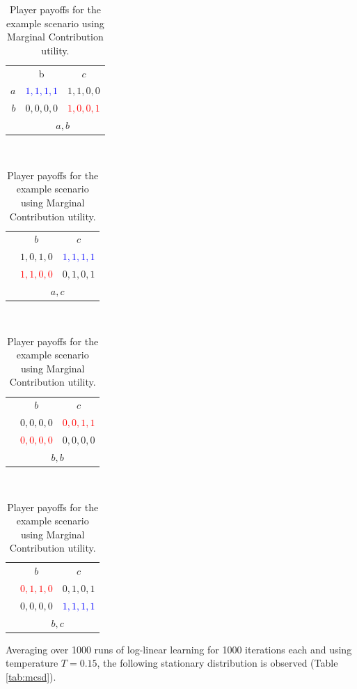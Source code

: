 \documentclass[11pt, onecolumn, compsoc, letterpaper]{article}
\begin{document}
\begin{table}[!htb]
	\centering\begin{tabular}{r|c|c|}
	\multicolumn{1}{c}{}
	& \multicolumn{1}{c}{b}
	& \multicolumn{1}{c}{$c$}\\
	\cline{2-3}
	$a$ & \textcolor{blue}{$1,1,1,1$} & $1,1,0,0$\\
	\cline{2-3}
	$b$ & $0,0,0,0$ & \textcolor{red}{$1,0,0,1$}\\
	\cline{2-3}
	\multicolumn{1}{c}{}
	& \multicolumn{2}{c}{$a,b$}
	\end{tabular}~
	\centering\begin{tabular}{r|c|c|}
	\multicolumn{1}{c}{}
	& \multicolumn{1}{c}{$b$}
	& \multicolumn{1}{c}{$c$}\\
	\cline{2-3}
	& $1,0,1,0$ & \textcolor{blue}{$1,1,1,1$}\\
	\cline{2-3}
	& \textcolor{red}{$1,1,0,0$} & $0,1,0,1$\\
	\cline{2-3}
	\multicolumn{1}{c}{}
	& \multicolumn{2}{c}{$a,c$}
	\end{tabular}~
	\centering\begin{tabular}{r|c|c|}
	\multicolumn{1}{c}{}
	& \multicolumn{1}{c}{$b$}
	& \multicolumn{1}{c}{$c$}\\
	\cline{2-3}
	& $0,0,0,0$ & \textcolor{red}{$0,0,1,1$}\\
	\cline{2-3}
	& \textcolor{red}{$0,0,0,0$} & $0,0,0,0$\\
	\cline{2-3}
	\multicolumn{1}{c}{}
	& \multicolumn{2}{c}{$b,b$}
	\end{tabular}~
	\centering\begin{tabular}{r|c|c|}
	\multicolumn{1}{c}{}
	& \multicolumn{1}{c}{$b$}
	& \multicolumn{1}{c}{$c$}\\
	\cline{2-3}
	& \textcolor{red}{$0,1,1,0$} & $0,1,0,1$\\
	\cline{2-3}
	& $0,0,0,0$ & \textcolor{blue}{$1,1,1,1$}\\
	\cline{2-3}
	\multicolumn{1}{c}{}
	& \multicolumn{2}{c}{$b,c$}
	\end{tabular}
	\centering\caption{Player payoffs for the example scenario using Marginal Contribution utility.}\label{tab:mcUtil}
\end{table}

Averaging over 1000 runs of log-linear learning for 1000 iterations each and using temperature $T = 0.15$, the following stationary distribution is observed (Table \ref{tab:mcsd}).
\end{document}
